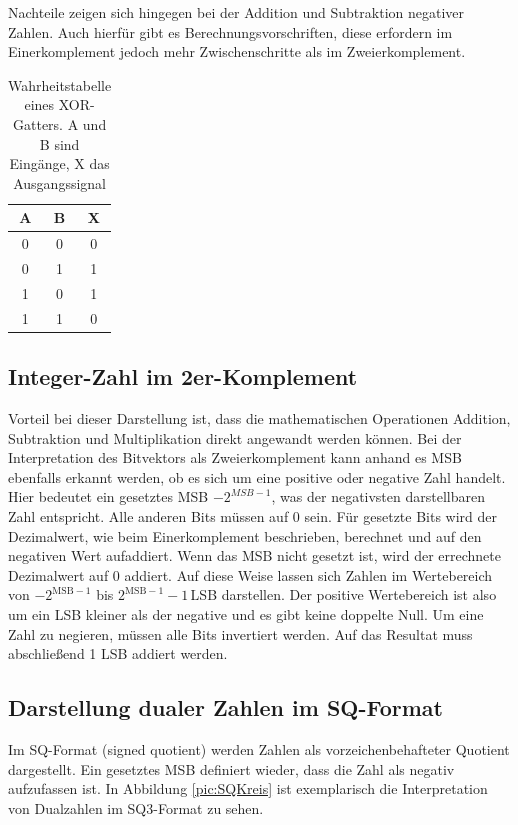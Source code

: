 Nachteile zeigen sich hingegen bei der Addition und Subtraktion negativer Zahlen. Auch hierfür gibt es Berechnungsvorschriften, diese erfordern im Einerkomplement jedoch mehr 
Zwischenschritte als im Zweierkomplement. 

\begin{table}[ht!]
 \centering
 \begin{tabular}{cc|c}
  A& B &X\\
  \hline
  0& 0&0\\
  0& 1&1\\
  1& 0&1\\
  1& 1&0\\
 \end{tabular}
 \caption{Wahrheitstabelle eines XOR-Gatters. A und B sind Eingänge, X das Ausgangssignal}
 \label{tab:xor}
\end{table}



\subsection{Integer-Zahl im 2er-Komplement}\label{sec:Integer2erKomplement}
Vorteil bei dieser Darstellung ist, dass die mathematischen Operationen Addition, Subtraktion und Multiplikation direkt angewandt werden können.
Bei der Interpretation des Bitvektors als Zweierkomplement kann anhand es MSB ebenfalls erkannt werden, ob es sich um eine positive oder negative Zahl handelt. 
Hier bedeutet ein gesetztes MSB $-2^{MSB-1}$, was der negativsten darstellbaren Zahl entspricht. 
Alle anderen Bits müssen auf 0 sein. Für gesetzte Bits wird der Dezimalwert, wie beim Einerkomplement beschrieben, berechnet und auf den negativen Wert aufaddiert. Wenn das MSB nicht gesetzt
ist, wird der errechnete Dezimalwert auf 0 addiert. Auf diese Weise lassen sich Zahlen im Wertebereich von $-2^{\textrm{MSB}-1}$ bis $2^{\textrm{MSB}-1}-1$\,LSB darstellen. Der positive
Wertebereich ist also um ein LSB kleiner als der negative und es gibt keine doppelte Null.
Um eine Zahl zu negieren, müssen alle Bits invertiert werden. Auf das Resultat muss abschließend 1 LSB addiert werden.
~\autocite[76]{reichardt2013lehrbuch}

\subsection{Darstellung dualer Zahlen im SQ-Format}
Im SQ-Format (signed quotient) werden Zahlen als vorzeichenbehafteter Quotient dargestellt. Ein gesetztes MSB definiert wieder, dass die Zahl als negativ aufzufassen ist.
In Abbildung \ref{pic:SQKreis} ist exemplarisch die Interpretation von Dualzahlen im SQ3-Format zu sehen.

